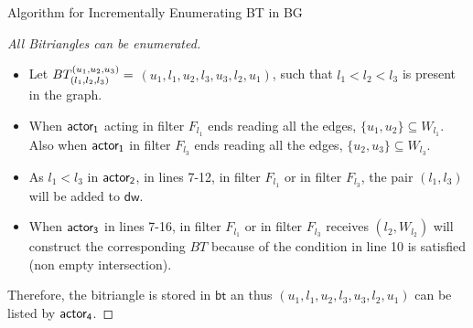 \begin{frame}[fragile]{Algorithm for Incrementally Enumerating BT in BG}
  \begin{proof}[All Bitriangles can be enumerated] 
    \begin{itemize}
      \item Let $BT_{(l_1, l_2,l_3)}^{(u_1, u_2, u_3)} =$  $(u_1,l_1,u_2,l_3,u_3,l_2,u_1)$, such that $l_1 < l_2 <l_3$ is present in the graph. 
      \item When $\mathsf{actor_1}$ acting in filter $F_{l_1}$ ends reading all the edges, $\{u_1,u_2\} \subseteq W_{l_1}$. Also when $\mathsf{actor_1}$ in filter $F_{l_3}$ ends reading all the edges, $\{u_2,u_3\} \subseteq W_{l_3}$. 
      \item As $l_1 < l_3$ in $\mathsf{actor_2}$, in lines 7-12, in filter $F_{l_1}$ or in filter $F_{l_3}$, the pair $(l_1,l_3)$  will be added to $\mathsf{dw}$.
      \item When $\mathsf{actor_3}$ in lines 7-16, in filter $F_{l_1}$ or in filter $F_{l_3}$ receives $(l_2, W_{l_2})$  will construct the corresponding  $BT$ because of the condition in line 10 is satisfied (non empty intersection). 
    \end{itemize}    
    Therefore, the bitriangle is stored in $\mathsf{bt}$ an thus $(u_1,l_1,u_2,l_3,u_3,l_2,u_1)$ can be listed by $\mathsf{actor_4}$.
  \end{proof}
    
\end{frame} 
